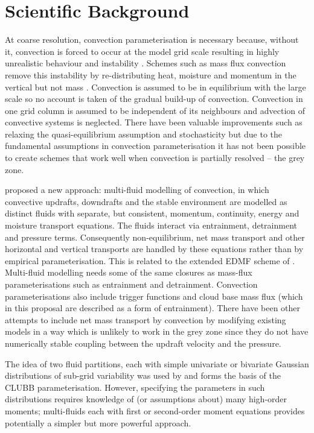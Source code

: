 \documentclass[11pt,a4paper]{article}
\begin{document}
\section{Scientific Background}

At coarse resolution, convection parameterisation is necessary because, without it, convection is forced to occur at the model grid scale resulting in highly unrealistic behaviour and instability \cite[]{PY15}. Schemes such as mass flux convection remove this instability by re-distributing heat, moisture and momentum in the vertical but not mass \cite[]{Tied89,GR90}. Convection is assumed to be in equilibrium with the large scale so no account is taken of the gradual build-up of convection. Convection in one grid column is assumed to be independent of its neighbours and advection of convective systems is neglected. There have been valuable improvements such as relaxing the quasi-equilibrium assumption \cite[]{PR98,GG05,Par14} and stochasticity \cite[]{PC08} but due to the fundamental assumptions in convection parameterisation it has not been possible to create schemes that work well when convection is partially resolved -- the grey zone.

\cite{TWV+18} proposed a new approach: multi-fluid modelling of convection, in which convective updrafts, downdrafts and the stable environment are modelled as distinct fluids with separate, but consistent, momentum, continuity, energy and moisture transport equations. The fluids interact via entrainment, detrainment and pressure terms. Consequently non-equilibrium, net mass transport and other horizontal and vertical transports are handled by these equations rather than by empirical parameterisation. This is related to the extended EDMF scheme of \cite{TKP+18}. Multi-fluid modelling needs some of the same closures as mass-flux parameterisations such as entrainment and detrainment. Convection parameterisations also include trigger functions and cloud base mass flux (which in this proposal are described as a form of entrainment). There have been other attempts to include net mass transport by convection \cite[]{KB08,MB19} by modifying existing models in a way which is unlikely to work in the grey zone since they do not have numerically stable coupling between the updraft velocity and the pressure.

The idea of two fluid partitions, each with simple univariate or bivariate Gaussian distributions of sub-grid variability was used by \cite{GLC02} and forms the basis of the CLUBB parameterisation. However, specifying the parameters in such distributions requires knowledge of (or assumptions about) many high-order moments; multi-fluids each with first or second-order moment equations provides potentially a simpler but more powerful approach.
\end{document}
